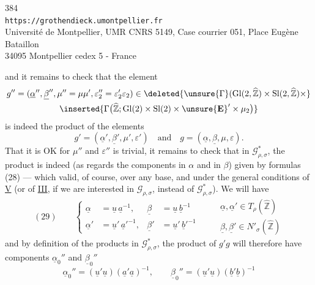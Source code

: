 \begin{center}
384\\
\texttt{https://grothendieck.umontpellier.fr}\\
Université de Montpellier, UMR CNRS 5149, Case courrier 051, Place Eugène Bataillon\\
34095 Montpellier cedex 5 - France
\end{center}

and it remains to check that the element
\[
\begin{gathered}
g''=(\underline\alpha'',\underline\beta'',\mu''=\mu\mu',\varepsilon_2''=\varepsilon_2'\varepsilon_2)
\in\deleted{\unsure{\Gamma}(\mathrm{Gl}(2,\widehat{\mathbb Z})\times\mathrm{Sl}(2,\widehat{\mathbb Z})\times}\\
\inserted{\Gamma\bigl(\widehat{\mathbb Z};\mathrm{Gl}(2)\times\mathrm{Sl}(2)\times\unsure{\mathbf E}'\times\mu_2\bigr)}
\end{gathered}
\]
is indeed the product of the elements
\[
g'=(\underline\alpha',\underline\beta',\mu',\varepsilon')\quad\text{and}\quad
g=(\underline\alpha,\underline\beta,\mu,\varepsilon).
\]
That it is OK for $\mu''$ and $\varepsilon''$ is trivial, it remains to check that in $\mathcal G_{\rho,\sigma}^{*}$, the product is indeed (as regards the components in $\alpha$ and in $\beta$) given by formulas (28) --- which  valid, of course, over any base, and under the general conditions of \uline{V} (or  of \uline{III}, if we are interested in $\mathcal G_{\rho,\sigma}$, instead of $\mathcal G_{\rho,\sigma}^{*}$). We will have
\[
(29)\qquad
\left\{\begin{aligned}
\underline\alpha&=\underline u\,\underline a^{-1},&
\underline\beta&=\underline u\,\underline b^{-1}\\
\underline\alpha'&=\underline u'\,\underline a'^{-1},&
\underline\beta'&=\underline u'\,\underline b'^{-1}
\end{aligned}\right.
\qquad
\begin{gathered}
\underline\alpha,\underline\alpha'\in T_\rho(\widehat{\mathbb Z})\\
\underline\beta,\underline\beta'\in N'_\sigma(\widehat{\mathbb Z})
\end{gathered}
\]
and by definition of the products in $\mathcal G_{\rho,\sigma}^{*}$, the product of  $g'g$ will therefore have components $\underline\alpha_0''$ and $\underline\beta_0''$
\[
\underline\alpha_0''=(\underline u'\underline u)(\underline a'\underline a)^{-1},\qquad
\underline\beta_0''=(\underline u'\underline u)(\underline b'\underline b)^{-1}
\]
